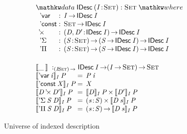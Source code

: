 \begin{figure}

\[\stk{
\begin{array}{ll}
\stk{
\data \IDesc{(\Bhab{\V{I}}{\Set})} : \Set \where \\
\;\;\begin{array}{@{}l@{\::\:\:}l@{\quad}l}
    \DVar{\!}         & \V{I} \To \IDesc{\V{I}}                                       \\
    \DConst{\!}       & \Set \To \IDesc{\V{I}}                                        \\
    \DProd{\!}{\!}    & \PI{\V{\V{D}}, \V{\V{D'}}}{\IDesc{\V{I}}} \IDesc{\V{I}}       \\
    \DSigma{\!}{\!}   & \PI{\V{S}}{\Set} \PIS{\V{S} \To \IDesc{\V{I}}} \IDesc{\V{I}}  \\
    \DPi{\!}{\!}      & \PI{\V{S}}{\Set} \PIS{\V{S} \To \IDesc{\V{I}}} \IDesc{\V{I}} 
\end{array}
}
\vspace{0.2in}
\\
\stk{
\idescop{\_\:}{}{} :_{\PI{\V{I}}{\Set}} \IDesc{\V{I}} \To (\V{\V{I}} \To \Set) \To \Set                  \\
\begin{array}{@{}l@{\:=\:\:}ll}
\idescop{\DVar{\V{i}}}{\V{I}}{\V{P}}      &  \V{P}\: \V{i}                                           \\
\idescop{\DConst{\V{X}}}{\V{I}}{\V{P}}    &  \V{X}                                                   \\
\idescop{\DProd{\V{D}}{\V{D'}}}{\V{I}}{\V{P}} &  \TIMES{\idescop{\V{D}}{\V{I}}{\V{P}}}{\idescop{\V{D'}}{\V{I}}{\V{P}}}       \\
\idescop{\DSigma{\V{S}}{\V{D}}}{\V{I}}{\V{P}} &  \SIGMA{\V{s}}{\V{S}} \idescop{\V{D}\: \V{s}}{\V{I}}{\V{P}}                    \\
\idescop{\DPi{\V{S}}{\V{D}}}{\V{I}}{\V{P}}    &  \PI{\V{s}}{\V{S}} \idescop{\V{D}\: \V{s}}{\V{I}}{\V{P}}            
\end{array}
}
\end{array}
}\]

\caption{Universe of indexed description}
\label{fig:idesc}

\end{figure}


